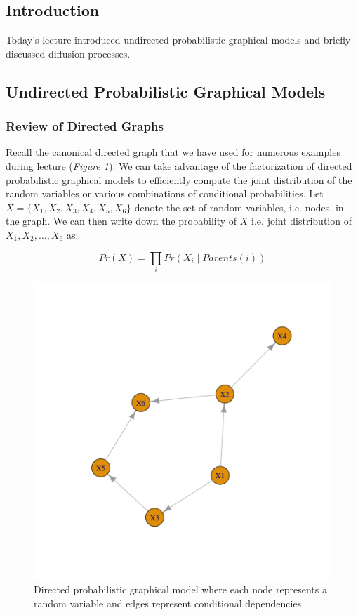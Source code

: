 \documentclass[12pt]{report}
\begin{document}

\maketitle

\vspace*{.1in}



\subsection*{Introduction}

Today's lecture introduced undirected probabilistic graphical models and briefly discussed diffusion processes.

\subsection*{Undirected Probabilistic Graphical Models}

\subsubsection*{Review of Directed Graphs}

Recall the canonical directed graph that we have used for numerous examples during lecture (\textit{Figure 1}). We can take advantage of the factorization of directed probabilistic graphical models to efficiently compute the joint distribution of the random variables or various combinations of conditional probabilities. Let $X = \{X_1, X_2, X_3, X_4, X_5, X_6\}$ denote the set of random variables, i.e. nodes, in the graph. We can then write down the probability of $X$ i.e. joint distribution of $X_1, X_2, \dots, X_6$ as:

$$Pr(X) = \prod_{i} Pr(X_i \mid Parents(i))$$ 

\begin{figure}[h!]
\centering
\includegraphics[width=.35\textwidth]{figures/lec17_graph1.png} 
\caption{Directed probabilistic graphical model where each node represents a random variable and edges represent conditional dependencies} \end{figure} 
\end{document}
